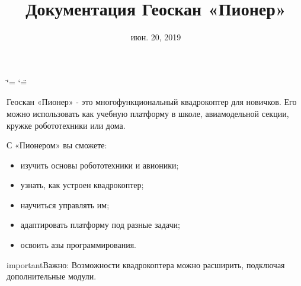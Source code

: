 \documentclass[a4paper,10pt,russian]{sphinxmanual}
\title{Документация Геоскан «Пионер»}
\date{июн. 20, 2019}
\author{}
\let\sphinxpxdimen\pdfpxdimen\else\newdimen\sphinxpxdimen
\begin{document}
\ifdefined\shorthandoff
  \ifnum\catcode`\=\string=\active\shorthandoff{=}\fi
  \ifnum\catcode`\"=\active{}\fi
\fi

\pagestyle{empty}
\maketitle
\pagestyle{plain}
\sphinxtableofcontents
\pagestyle{normal}
\label{\detokenize{index::doc}}



\begin{DUlineblock}{0em}
\item[] Геоскан «Пионер» - это многофункциональный квадрокоптер для новичков. Его можно использовать как учебную платформу в школе, авиамодельной секции, кружке робототехники или дома.
\end{DUlineblock}

\noindent{\hspace*{\fill}\sphinxincludegraphics[width=420\sphinxpxdimen]{{pioneer}.png}\hspace*{\fill}}

С «Пионером» вы сможете:
\begin{itemize}
\item {} 
изучить основы робототехники и авионики;

\item {} 
узнать, как устроен квадрокоптер;

\item {} 
научиться управлять им;

\item {} 
адаптировать платформу под разные задачи;

\item {} 
освоить азы программирования.

\end{itemize}

\begin{sphinxadmonition}{important}{Важно:}
Возможности квадрокоптера можно расширить, подключая дополнительные модули.
\end{sphinxadmonition}
\end{document}
